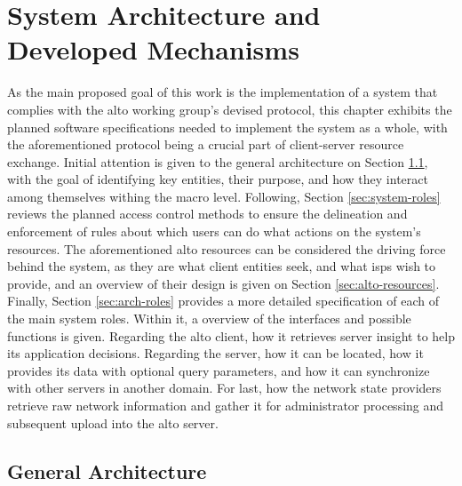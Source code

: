 \chapter{System Architecture and Developed Mechanisms}

    As the main proposed goal of this work is the implementation of a system that complies with the \gls{alto} working group's devised protocol, this chapter exhibits the planned software specifications needed to implement the system as a whole, with the aforementioned protocol being a crucial part of client-server resource exchange.
    Initial attention is given to the general architecture on Section \ref{sec:arch-general}, with the goal of identifying key entities, their purpose, and how they interact among themselves withing the macro level.
    Following, Section \ref{sec:system-roles} reviews the planned access control methods to ensure the delineation and enforcement of rules about which users can do what actions on the system's resources.
    The aforementioned \gls{alto} resources can be considered the driving force behind the system, as they are what client entities seek, and what \glspl{isp} wish to provide, and an overview of their design is given on Section \ref{sec:alto-resources}.
    Finally, Section \ref{sec:arch-roles} provides a more detailed specification of each of the main system roles.
    Within it, a overview of the interfaces and possible functions is given.
    Regarding the \gls{alto} client, how it retrieves server insight to help its application decisions.
    Regarding the server, how it can be located, how it provides its data with optional query parameters, and how it can synchronize with other servers in another domain.
    For last, how the network state providers retrieve raw network information and gather it for administrator processing and subsequent upload into the \gls{alto} server.

\section{General Architecture}

\label{sec:arch-general}

